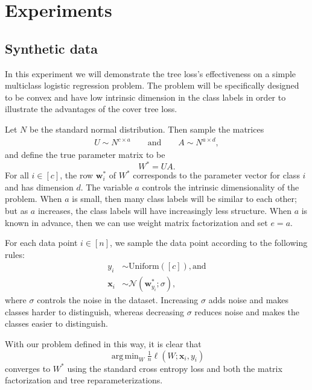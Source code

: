 \documentclass[twoside]{article}
\theoremstyle{definition}
\DeclareMathOperator*{\argmin}{arg\,min}
\newcommand{\w}{\mathbf w}
\newcommand{\x}{\mathbf x}
\newcommand{\fixme}[1]{\noindent{\color{red}\textbf{FIXME:}  {#1}}}
\begin{document}
\section{Experiments}

\subsection{Synthetic data}

In this experiment we will demonstrate the tree loss's effectiveness on a simple multiclass logistic regression problem.
The problem will be specifically designed to be convex and have low intrinsic dimension in the class labels in order to illustrate the advantages of the cover tree loss.

Let $N$ be the standard normal distribution.
Then sample the matrices
\begin{align}
    U \sim N^{c\times a} \qquad\text{and}\qquad
    A \sim N^{a\times d},
\end{align}
and define the true parameter matrix to be
\begin{equation}
    W^* = UA.
\end{equation}
For all $i \in [c]$, the row $\w_i^*$ of $W^*$ corresponds to the parameter vector for class $i$ and has dimension $d$.
The variable $a$ controls the intrinsic dimensionality of the problem.
When $a$ is small, then many class labels will be similar to each other;
but as $a$ increases, the class labels will have increasingly less structure.
When $a$ is known in advance, then we can use weight matrix factorization and set $e=a$.

For each data point $i\in[n]$,
we sample the data point according to the following rules:
\begin{align}
    y_i &\sim \text{Uniform}([c]), \text{and} \\
    \x_{i} &\sim \mathcal N(\w^*_{y_i}; \sigma),
\end{align}
where $\sigma$ controls the noise in the dataset.
Increasing $\sigma$ adds noise and makes classes harder to distinguish,
whereas decreasing $\sigma$ reduces noise and makes the classes easier to distinguish.

With our problem defined in this way, it is clear that
\begin{equation}
    \argmin_{W} \tfrac 1 n \ell(W; \x_i, y_i)
\end{equation}
converges to $W^*$ using the standard cross entropy loss and both the matrix factorization and tree reparameterizations.
\end{document}
